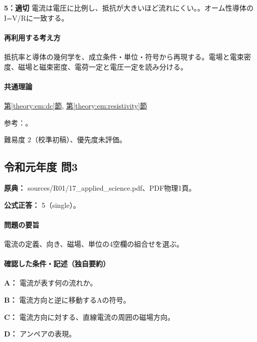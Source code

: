 \noindent\textbf{5：適切} 電流は電圧に比例し、抵抗が大きいほど流れにくい。。オーム性導体のI=\allowbreak{}V/Rに一致する。\par

\paragraph{再利用する考え方} 抵抗率と導体の幾何学を、成立条件・単位・符号から再現する。電場と電束密度、磁場と磁束密度、電荷一定と電圧一定を読み分ける。

\paragraph{共通理論} \hyperref[theory:em:dc]{第\ref*{theory:em:dc}節}, \hyperref[theory:em:resistivity]{第\ref*{theory:em:resistivity}節}

\par 参考：\cite{mit_em06}。

\par 難易度 2（校準初稿）、優先度未評価。

\subsection{令和元年度 問3}
\label{q:r01-reg-applied-03}

\noindent\textbf{原典：} sources/R01/17\_applied\_science.pdf、PDF物理1頁。

\textbf{公式正答：} 5（single）。

\paragraph{問題の要旨} 電流の定義、向き、磁場、単位の4空欄の組合せを選ぶ。

\paragraph{確認した条件・記述（独自要約）}\mbox{}\par

\noindent\textbf{A：} 電流が表す何の流れか。\par

\noindent\textbf{B：} 電流方向と逆に移動するAの符号。\par

\noindent\textbf{C：} 電流方向に対する、直線電流の周囲の磁場方向。\par

\noindent\textbf{D：} アンペアの表現。\par

